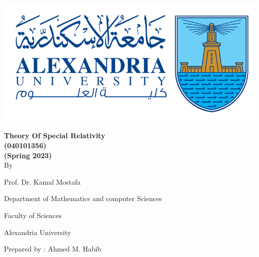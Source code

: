 \begingroup
{}
\thispagestyle{empty}
\vspace*{\fill}
\endgroup
\newpage
\thispagestyle{empty}

\begingroup
{}
\begin{center}
    \includegraphics[scale=.5]{collage logo.png}
    \vspace*{1.5cm}
    \par
    {\fontsize{20pt}{30pt}\selectfont
        \textbf{Theory Of Special Relativity\\(040101356)\\(Spring 2023)}
        \\
        \vspace*{.75cm}
        By
        \vspace*{.75cm}

        Prof. Dr. Kamal Mostafa

        Department of Mathematics and computer Sciences

        Faculty of Sciences

        Alexandria University
    }

    \vspace*{\fill}
    {\fontsize{10pt}{10pt}\selectfont
    Prepared by : Ahmed M. Habib
    }
\end{center}
\restoregeometry
\endgroup
\newpage
\tableofcontents
\thispagestyle{empty}
\newpage
\setcounter{page}{1}
